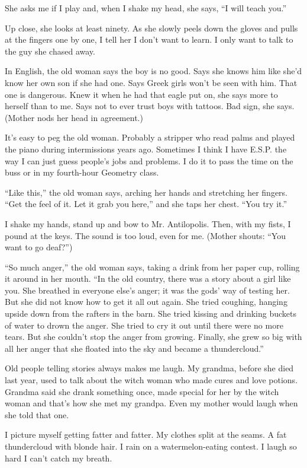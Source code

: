 \documentclass[twoside,10pt]{book}
\begin{document}
She asks me if I play and, when I shake my head, she says, ``I will
teach you.''

Up close, she looks at least ninety. As she slowly peels down the gloves
and pulls at the fingers one by one, I tell her I don't want to learn. I
only want to talk to the guy she chased away.

In English, the old woman says the boy is no good. Says she knows him
like she'd know her own son if she had one. Says Greek girls won't be
seen with him. That one is dangerous. Knew it when he had that eagle put
on, she says more to herself than to me. Says not to ever trust boys
with tattoos. Bad sign, she says. (Mother nods her head in agreement.)

It's easy to peg the old woman. Probably a stripper who read palms and
played the piano dur­ing intermissions years ago. Sometimes I think I
have E.S.P. the way I can just guess people's jobs and problems. I do it
to pass the time on the buss or in my fourth-hour Geometry class.

``Like this,'' the old woman says, arching her hands and stretching her
fingers. ``Get the feel of it. Let it grab you here,'' and she taps her
chest. ``You try it.''

I shake my hands, stand up and bow to Mr. Antilopolis. Then, with my
fists, I pound at the keys. The sound is too loud, even for me. (Mother
shouts: ``You want to go deaf?'')

``So much anger,'' the old woman says, taking a drink from her paper
cup, rolling it around in her mouth. ``In the old country, there was a
story about a girl like you. She breathed in everyone else's anger; it
was the gods' way of testing her. But she did not know how to get it all
out again. She tried coughing, hanging upside down from the rafters in
the barn. She tried kissing and drinking buckets of water to drown the
anger. She tried to cry it out until there were no more tears. But she
couldn't stop the anger from growing. Finally, she grew so big with all
her anger that she floated into the sky and became a thundercloud.''

Old people telling stories always makes me laugh. My grandma, before she
died last year, used to talk about the witch woman who made cures and
love potions. Grandma said she drank something once, made special for
her by the witch woman and that's how she met my grandpa. Even my mother
would laugh when she told that one.

I picture myself getting fatter and fatter. My clothes split at the
seams. A fat thundercloud with blonde hair. I rain on a
watermelon-eating contest. I laugh so hard I can't catch my breath.
\end{document}
